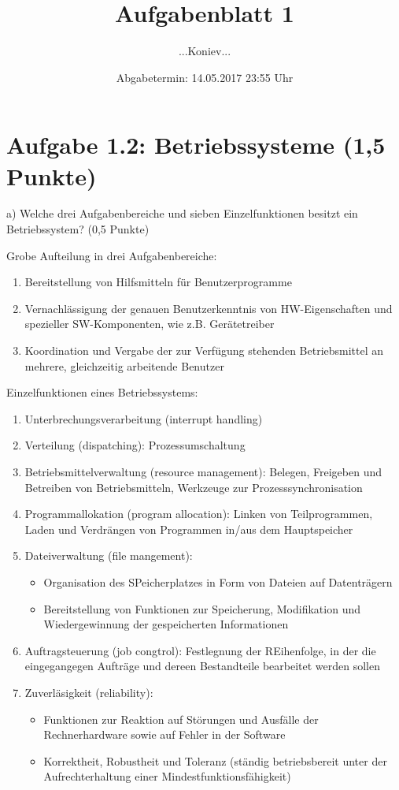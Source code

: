 \documentclass[a4paper,12pt]{article}
\author{...Koniev...}    %
\title{Aufgabenblatt 1}
\date{Abgabetermin: 14.05.2017 23:55 Uhr}
\begin{document}
 

\maketitle

\section*{Aufgabe 1.2: Betriebssysteme (1,5 Punkte)}
 a) Welche drei Aufgabenbereiche und sieben Einzelfunktionen besitzt ein Betriebssystem? (0,5 Punkte)
 
\vspace{\baselineskip}
 \large Grobe Aufteilung in drei Aufgabenbereiche:
 
 \normalsize
 \begin{enumerate}
 	\item Bereitstellung von Hilfsmitteln für Benutzerprogramme
 	\item Vernachlässigung der genauen Benutzerkenntnis von HW-Eigenschaften und spezieller SW-Komponenten, wie z.B. Gerätetreiber
 	\item Koordination und Vergabe der zur Verfügung stehenden Betriebsmittel an mehrere, gleichzeitig arbeitende Benutzer
 \end{enumerate}


\vspace{\baselineskip}
\large Einzelfunktionen eines Betriebssystems:
\normalsize
\begin{enumerate}
	\item Unterbrechungsverarbeitung (interrupt handling)
	\item Verteilung (dispatching): Prozessumschaltung
	\item Betriebsmittelverwaltung (resource management): Belegen, Freigeben und Betreiben von Betriebsmitteln, Werkzeuge zur Prozesssynchronisation
	\item Programmallokation (program allocation): Linken von Teilprogrammen, Laden und Verdrängen von Programmen in/aus dem Hauptspeicher
	\item Dateiverwaltung (file mangement): 
	\begin{itemize}
		\item Organisation des SPeicherplatzes in Form von Dateien auf Datenträgern
		\item Bereitstellung von Funktionen zur Speicherung, Modifikation und Wiedergewinnung der gespeicherten Informationen
	\end{itemize}
	\item Auftragsteuerung (job congtrol): Festlegnung der REihenfolge, in der die eingegangegen Aufträge und dereen Bestandteile bearbeitet werden sollen
	\item Zuverläsigkeit (reliability):
	\begin{itemize}
		\item Funktionen zur Reaktion auf Störungen und Ausfälle der Rechnerhardware sowie auf Fehler in der Software
		\item Korrektheit, Robustheit und Toleranz (ständig betriebsbereit unter der Aufrechterhaltung einer Mindestfunktionsfähigkeit)
	\end{itemize}
\end{enumerate}
\end{document}
